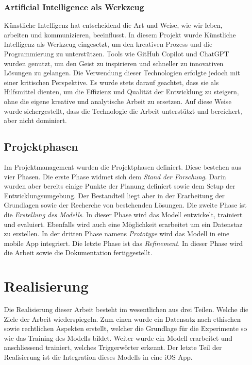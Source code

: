 \documentclass[11pt,a4paper]{article}
\begin{document}
\subsubsection{Artificial Intelligence als Werkzeug}
Künstliche Intelligenz hat entscheidend die Art und Weise, wie wir leben, arbeiten und 
kommunizieren, beeinflusst. In diesem Projekt wurde Künstliche Intelligenz als Werkzeug eingesetzt, 
um den kreativen Prozess und die Programmierung zu unterstützen. Tools wie GitHub Copilot und 
ChatGPT wurden genutzt, um den Geist zu inspirieren und schneller zu innovativen Lösungen zu 
gelangen. Die Verwendung dieser Technologien erfolgte jedoch mit einer kritischen Perspektive. Es 
wurde stets darauf geachtet, dass sie als Hilfsmittel dienten, um die Effizienz und Qualität der 
Entwicklung zu steigern, ohne die eigene kreative und analytische Arbeit zu ersetzen. Auf diese 
Weise wurde sichergestellt, dass die Technologie die Arbeit unterstützt und bereichert, aber nicht 
dominiert.


\subsection{Projektphasen}
Im Projektmanagement wurden die Projektphasen definiert. Diese bestehen aus vier Phasen. Die erste
Phase widmet sich dem \textit{Stand der Forschung}. Darin wurden aber bereits einige Punkte der 
Planung definiert sowie dem Setup der Entwicklungsumgebung. Der Bestandteil liegt aber in der 
Erarbeitung der Grundlagen sowie der Recherche von bestehenden Lösungen. Die zweite Phase ist die 
\textit{Erstellung des Modells}. In dieser Phase wird das Modell entwickelt, trainiert und 
evaluiert. Ebenfalls wird auch eine Möglichkeit erarbeitet um ein Datenstaz zu erstellen. In der 
dritten Phase namens \textit{Prototype} wird das Modell in eine mobile App integriert. 
Die letzte Phase ist das \textit{Refinement}. In dieser Phase wird die Arbeit sowie die
Dokumentation fertiggestellt. 


\newpage \section{Realisierung}
Die Realisierung dieser Arbeit besteht im wesentlichen aus drei Teilen. Welche die Ziele der Arbeit 
wiederspiegeln. Zum einen wurde ein Datensatz nach ethischen sowie rechtlichen Aspekten erstellt, 
welcher die Grundlage für die Experimente so wie das Training des Modells bildet. Weiter wurde ein 
Modell erarbeitet und anschliessend trainiert, welches Triggerwörter erkennt. Der letzte Teil der 
Realisierung ist die Integration dieses Modells in eine iOS App.
\end{document}
